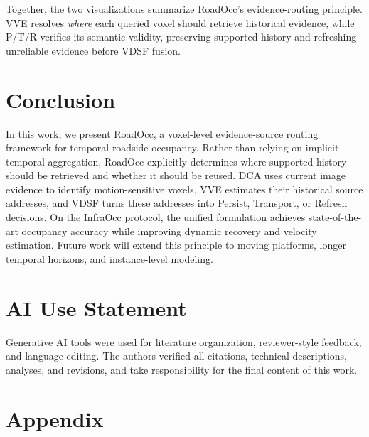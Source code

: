 \documentclass{article}
\begin{document}
Together, the two visualizations summarize RoadOcc's evidence-routing principle.
VVE resolves \emph{where} each queried voxel should retrieve historical evidence,
while P/T/R verifies its semantic validity, preserving supported history and
refreshing unreliable evidence before VDSF fusion.

\section{Conclusion}
\label{sec:conclusion}

In this work, we present RoadOcc, a voxel-level evidence-source routing framework for temporal
roadside occupancy. Rather than relying on implicit temporal aggregation,
RoadOcc explicitly determines where supported history should be retrieved and
whether it should be reused. DCA uses current image evidence to identify
motion-sensitive voxels, VVE estimates their historical source addresses, and
VDSF turns these addresses into Persist, Transport, or Refresh decisions. On
the InfraOcc protocol, the unified formulation achieves state-of-the-art
occupancy accuracy while improving dynamic recovery and velocity estimation.
Future work will extend this principle to moving platforms, longer temporal horizons, and
instance-level modeling.
\section*{AI Use Statement}
Generative AI tools were used for literature organization, reviewer-style
feedback, and language editing. The authors verified all citations, technical
descriptions, analyses, and revisions, and take responsibility for the final
content of this work.


\clearpage
\onecolumn
\section*{Appendix}

\appendix

\end{document}
